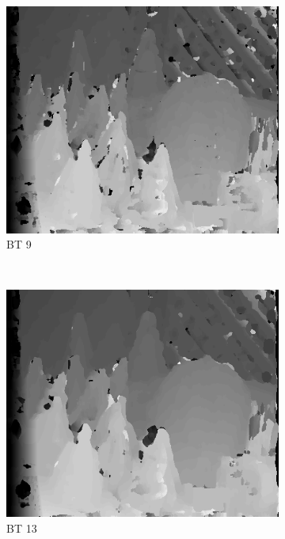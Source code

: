 \begin{figure}
  \begin{subfigure}[b]{0.23\textwidth}
    \centering
    \includegraphics[width=\textwidth]{images/stereo-pairs/cones_bt_9.png}
    \caption{BT 9}
  \end{subfigure}
  ~
  \begin{subfigure}[b]{0.23\textwidth}
    \centering
    \includegraphics[width=\textwidth]{images/stereo-pairs/cones_bt_13.png}
    \caption{BT 13}
  \end{subfigure}
  ~
  \begin{subfigure}[b]{0.23\textwidth}

\end{subfigure}
\end{figure}
